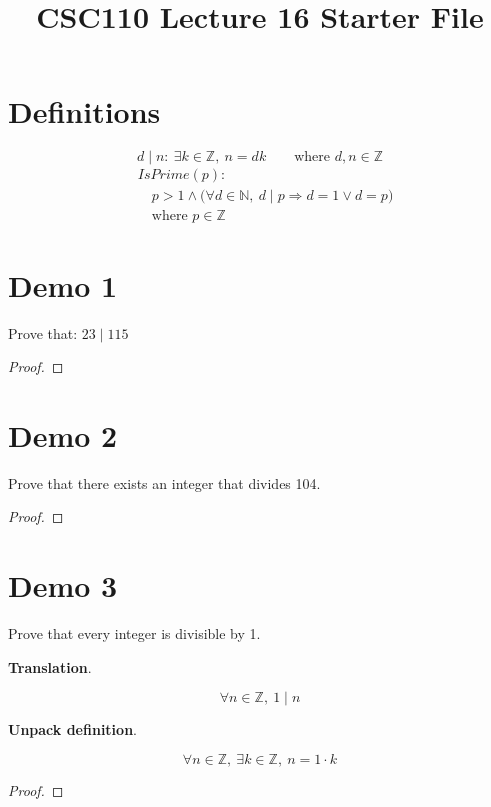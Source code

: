 \documentclass[14pt]{article}
\title{CSC110 Lecture 16 Starter File}
\author{}
\date{}
\begin{document}
\maketitle

\newcommand{\N}{\mathbb{N}}
\newcommand{\Z}{\mathbb{Z}}
\newcommand{\floor}[1]{\lfloor #1 \rfloor}

\section*{Definitions}

$$d \mid n:~ \exists k \in \Z,~ n = dk \qquad \text{where $d, n \in \Z$}$$
\begin{align*}
& IsPrime(p): \\
& \quad p > 1 \land \big(\forall d \in \N,~ d \mid p \Rightarrow d = 1 \lor d = p\big) \\
& \quad \text{where $p \in \Z$}
\end{align*}

\section*{Demo 1}
Prove that: $23 \mid 115$

\begin{proof}
\end{proof}

\section*{Demo 2}
Prove that there exists an integer that divides 104.

\begin{proof}
\end{proof}

\newpage
\section*{Demo 3}
Prove that every integer is divisible by 1.

\textbf{Translation}.

$$\forall n \in \Z,~ 1 \mid n$$

\textbf{Unpack definition}.

$$\forall n \in \Z,~ \exists k \in \Z,~ n = 1 \cdot k$$

\begin{proof}
\end{proof}
\end{document}
